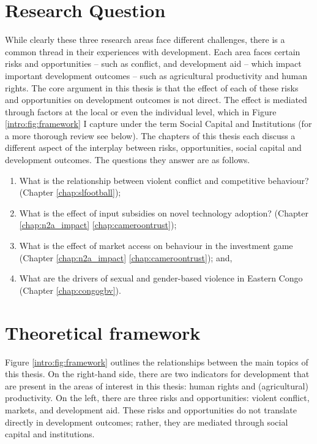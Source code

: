 \section{Research Question}
While clearly these three research areas face different challenges, there is a common thread in their experiences with development. Each area faces certain risks and opportunities -- such as conflict, and development aid -- which impact important development outcomes -- such as agricultural productivity and human rights. The core argument in this thesis is that the effect of each of these risks and opportunities on development outcomes is not direct. The effect is mediated through factors at the local or even the individual level, which in Figure \ref{intro:fig:framework} I capture under the term Social Capital and Institutions (for a more thorough review see below). The chapters of this thesis each discuss a different aspect of the interplay between risks, opportunities, social capital and development outcomes. The questions they answer are as follows.
\begin{enumerate}
	\item What is the relationship between violent conflict and competitive behaviour? (Chapter \ref{chap:slfootball});
	\item What is the effect of input subsidies on novel technology adoption? (Chapter \ref{chap:n2a_impact}
\ref{chap:cameroontrust});
	\item What is the effect of market access on behaviour in the investment game (Chapter \ref{chap:n2a_impact}
\ref{chap:cameroontrust}); and,
	\item What are the drivers of sexual and gender-based violence in Eastern Congo (Chapter \ref{chap:congogbv}).
\end{enumerate}

\section{Theoretical framework}
Figure \ref{intro:fig:framework} outlines the relationships between the main topics of this thesis. On the right-hand side, there are two indicators for development that are present in the areas of interest in this thesis: human rights and (agricultural) productivity. On the left, there are three risks and opportunities: violent conflict, markets, and development aid. These risks and opportunities do not translate directly in development outcomes; rather, they are mediated through social capital and institutions.


